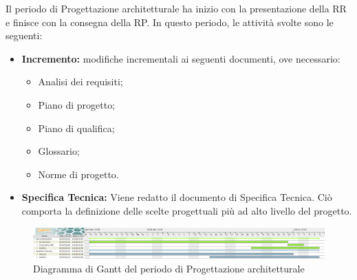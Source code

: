 Il periodo di Progettazione architetturale ha inizio con la presentazione della RR e finisce con la consegna della RP.\newline
In questo periodo, le attività svolte sono le seguenti:
\begin{itemize}
	\item \textbf{Incremento: }modifiche incrementali ai seguenti documenti, ove necessario:
	\begin{itemize}
		\item Analisi dei requisiti;
		\item Piano di progetto;
		\item Piano di qualifica;
		\item Glossario;
		\item Norme di progetto.
	\end{itemize}
	\item \textbf{Specifica Tecnica: }Viene redatto il documento di Specifica Tecnica. Ciò comporta la definizione delle scelte progettuali più ad alto livello del progetto.
\end{itemize}

\begin{figure}[H]
	\includegraphics[width=1\linewidth]{Pianificazione/Progettazione_Architetturale_Gantt.png}
	\caption{Diagramma di Gantt del periodo di Progettazione architetturale}
\end{figure}